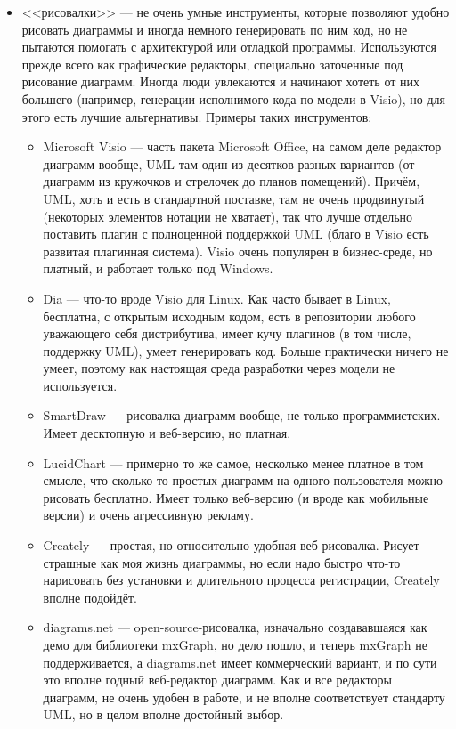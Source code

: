 \documentclass[a5paper]{article}
\begin{document}
\begin{itemize}
    \item <<рисовалки>> --- не очень умные инструменты, которые позволяют удобно рисовать диаграммы и иногда немного генерировать по ним код, но не пытаются помогать с архитектурой или отладкой программы. Используются прежде всего как графические редакторы, специально заточенные под рисование диаграмм. Иногда люди увлекаются и начинают хотеть от них большего (например, генерации исполнимого кода по модели в Visio), но для этого есть лучшие альтернативы. Примеры таких инструментов:
    \begin{itemize}
        \item Microsoft Visio --- часть пакета Microsoft Office, на самом деле редактор диаграмм вообще, UML там один из десятков разных вариантов (от диаграмм из кружочков и стрелочек до планов помещений). Причём, UML, хоть и есть в стандартной поставке, там не очень продвинутый (некоторых элементов нотации не хватает), так что лучше отдельно поставить плагин с полноценной поддержкой UML (благо в Visio есть развитая плагинная система). Visio очень популярен в бизнес-среде, но платный, и работает только под Windows.
        \item Dia --- что-то вроде Visio для Linux. Как часто бывает в Linux, бесплатна, с открытым исходным кодом, есть в репозитории любого уважающего себя дистрибутива, имеет кучу плагинов (в том числе, поддержку UML), умеет генерировать код. Больше практически ничего не умеет, поэтому как настоящая среда разработки через модели не используется.
        \item SmartDraw --- рисовалка диаграмм вообще, не только программистских. Имеет десктопную и веб-версию, но платная.
        \item LucidChart --- примерно то же самое, несколько менее платное в том смысле, что сколько-то простых диаграмм на одного пользователя можно рисовать бесплатно. Имеет только веб-версию (и вроде как мобильные версии) и очень агрессивную рекламу.
        \item Creately --- простая, но относительно удобная веб-рисовалка. Рисует страшные как моя жизнь диаграммы, но если надо быстро что-то нарисовать без установки и длительного процесса регистрации, Creately вполне подойдёт.
        \item diagrams.net --- open-source-рисовалка, изначально создававшаяся как демо для библиотеки mxGraph, но дело пошло, и теперь mxGraph не поддерживается, а diagrams.net имеет коммерческий вариант, и по сути это вполне годный веб-редактор диаграмм. Как и все редакторы диаграмм, не очень удобен в работе, и не вполне соответствует стандарту UML, но в целом вполне достойный выбор.

\end{itemize}
\end{itemize}
\end{document}
